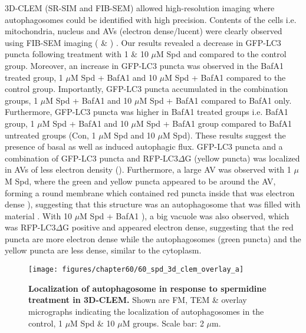 3D-CLEM (SR-SIM and FIB-SEM) allowed high-resolution imaging where autophagosomes could be identified with high precision. Contents of the cells i.e. mitochondria, nucleus and AVs (electron dense/lucent) were clearly observed using FIB-SEM imaging ( \& ) . Our results revealed a decrease in GFP-LC3 puncta following treatment with 1 \& 10 $\mu$M Spd and compared to the control group. Moreover, an increase in GFP-LC3 puncta was observed in the BafA1 treated group, 1 $\mu$M Spd + BafA1 and 10 $\mu$M Spd + BafA1 compared to the control group. Importantly, GFP-LC3 puncta accumulated in the combination groups, 1 $\mu$M Spd + BafA1 and 10 $\mu$M Spd + BafA1 compared to BafA1 only. Furthermore, GFP-LC3 puncta was higher in BafA1 treated groups i.e. BafA1 group, 1 $\mu$M Spd + BafA1 and 10 $\mu$M Spd + BafA1 group compared to BafA1 untreated groups (Con, 1 $\mu$M Spd and 10 $\mu$M Spd). These results suggest the presence of basal as well as induced autophagic flux. GFP-LC3 puncta and a combination of GFP-LC3 puncta and RFP-LC3$\Delta$G (yellow puncta) was localized in AVs of less electron density (). Furthermore, a large AV was observed with 1 $\mu$M Spd, where the green and yellow puncta appeared to be around the AV, forming a round membrane which contained red puncta inside that was electron dense ), suggesting that this structure was an autophagosome that was filled with material . With 10 $\mu$M Spd + BafA1 ), a big vacuole was also observed, which was RFP-LC3$\Delta$G positive and appeared electron dense, suggesting that the red puncta are more electron dense while the autophagosomes (green puncta) and the yellow puncta are less dense, similar to the cytoplasm. 

\begin{landscape}
\begin{figure}[!htbp]
\center
  \texttt{[image: figures/chapter60/60\_spd\_3d\_clem\_overlay\_a]}
  \caption[Localization of autophagosome in response to spermidine treatment in 3D-CLEM]{\textbf{Localization of autophagosome in response to spermidine treatment in 3D-CLEM.} Shown are FM, TEM \& overlay micrographs indicating the localization of autophagosomes in the control, 1 $\mu$M Spd \& 10 $\mu$M groups. Scale bar: 2 $\mu$m.}
  \label{fig:60_spd_3d_clem_overlay_a}
\end{figure} 
\end{landscape}

